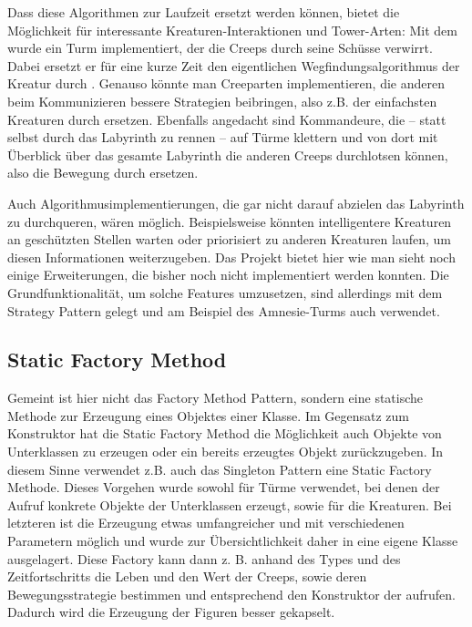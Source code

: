 Dass diese Algorithmen zur Laufzeit ersetzt werden können, bietet die Möglichkeit für interessante Kreaturen-Interaktionen und Tower-Arten: Mit dem  wurde ein Turm implementiert, der die Creeps durch seine Schüsse verwirrt. Dabei ersetzt er für eine kurze Zeit den eigentlichen Wegfindungsalgorithmus der Kreatur durch . Genauso könnte man Creeparten implementieren, die anderen beim Kommunizieren bessere Strategien beibringen, also z.B.  der einfachsten Kreaturen durch  ersetzen. Ebenfalls angedacht sind Kommandeure, die -- statt selbst durch das Labyrinth zu rennen -- auf Türme klettern und von dort mit Überblick über das gesamte Labyrinth die anderen Creeps durchlotsen können, also die Bewegung durch  ersetzen. 

Auch Algorithmusimplementierungen, die gar nicht darauf abzielen das Labyrinth zu durchqueren, wären möglich. Beispielsweise könnten intelligentere Kreaturen an geschützten Stellen warten oder priorisiert zu anderen Kreaturen laufen, um diesen Informationen weiterzugeben. Das Projekt bietet hier wie man sieht noch einige Erweiterungen, die bisher noch nicht implementiert werden konnten. Die Grundfunktionalität, um solche Features umzusetzen, sind allerdings mit dem Strategy Pattern gelegt und am Beispiel des Amnesie-Turms auch verwendet.


\subsection{Static Factory Method} %
\label{sub:static_factory_method}
Gemeint ist hier nicht das Factory Method Pattern, sondern eine statische Methode zur Erzeugung eines Objektes einer Klasse. Im Gegensatz zum Konstruktor hat die Static Factory Method die Möglichkeit auch Objekte von Unterklassen zu erzeugen oder ein bereits erzeugtes Objekt zurückzugeben. In diesem Sinne verwendet z.B. auch das Singleton Pattern eine Static Factory Methode. Dieses Vorgehen wurde sowohl für Türme verwendet, bei denen der Aufruf konkrete Objekte der Unterklassen erzeugt, sowie für die Kreaturen. Bei letzteren ist die Erzeugung etwas umfangreicher und mit verschiedenen Parametern möglich und wurde zur Übersichtlichkeit daher in eine eigene Klasse  ausgelagert. Diese Factory kann dann z. B. anhand des Types und des Zeitfortschritts die Leben und den Wert der Creeps, sowie deren Bewegungsstrategie bestimmen und entsprechend den Konstruktor der  aufrufen. Dadurch wird die Erzeugung der Figuren besser gekapselt.

